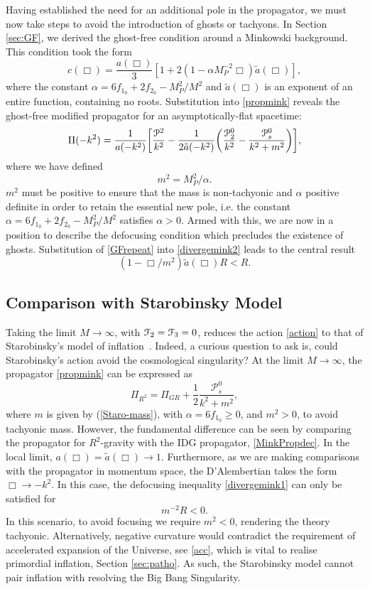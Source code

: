 Having established the need for an additional pole in the propagator, we must now take steps to avoid the introduction of ghosts or tachyons. In  Section \ref{sec:GF}, we derived the ghost-free condition around a Minkowski background. This condition took the form
\[
\label{GFrepeat}
c(\Box)=\frac{a(\Box)}{3}\left[1+2(1-\alpha M_P^{-2}\Box){\tilde a}(\Box)\right]
, \]
where the constant $\alpha=6f_{1_{0}}+2f_{2_{0}}-M_{P}^{2}/M^{2}$ and ${\tilde a}(\Box)$ is an exponent of an entire function, containing no roots. Substitution into \eqref{propmink} reveals the ghost-free modified propagator for an asymptotically-flat spacetime:
\[
\label{MinkPropdec}
\Pi(-k^{2})=\frac{1}{a(-k^{2})}\biggl[\frac{{\cal P}^{2}}{k^{2}}-\frac{1}{2\tilde{a}(-k^{2})}\biggl(\frac{{\cal P}_{2}^{0}}{k^{2}}-\frac{{\cal P}_{s}^{0}}{k^{2}+m^{2}}\biggr)\biggr]
, \]
where we have defined
\[
\label{Staro-mass}
m^2=M_P^2/\alpha
.\]
$m^2$ must be positive to ensure that the mass is non-tachyonic and $\alpha$ positive definite in order to retain the essential new pole, i.e. the constant $\alpha=6f_{1_{0}}+2f_{2_{0}}-M_{P}^{2}/M^{2}$ satisfies $\alpha>0$. Armed with this, we are now in a position to describe the defocusing condition which precludes the existence of ghosts. Substitution of \eqref{GFrepeat} into \eqref{divergemink2} leads to the central result
\[
\label{defocusmink}
(1-\Box/m^2){\tilde a}(\Box)R<R
.\]
\subsection{Comparison with Starobinsky Model}
Taking the limit $M \rightarrow \infty$, with  ${\cal F}_2={\cal F}_3=0$, reduces the action \eqref{action} to that of Starobinsky's model of 
inflation~\cite{Starobinsky:1979ty}. Indeed, a curious question to ask is, could Starobinsky's action avoid the cosmological singularity? At the limit $M\rightarrow \infty$,  the propagator \eqref{propmink} can be expressed as
\[
\label{propR2}
\Pi_{R^{2}}=\Pi_{GR}+\frac{1}{2}\frac{\mathcal{P}_{s}^{0}}{k^{2}+m^{2}} ,
\]
where $m$ is given by (\ref{Staro-mass}), with $\alpha=6f_{1_0}\geq 0$, and $m^2>0$, to avoid tachyonic mass.
 However, the fundamental difference can be seen by comparing the propagator for $R^2$-gravity with the IDG propagator, \eqref{MinkPropdec}.  In the local limit, $a(\Box)={\widetilde a}(\Box)\rightarrow 1$. Furthermore, as we are making comparisons with the propagator in momentum space, the D'Alembertian takes the form $\Box\rightarrow -k^2$. In this case, the defocusing inequality \eqref{divergemink1} can only be satisfied for 
\[
m^{-2} R<0
.\]
In this scenario, to avoid focusing we require $m^2< 0$, rendering the theory tachyonic. Alternatively, negative curvature would contradict the requirement of accelerated expansion of the Universe, see \eqref{acc}, which is vital to realise primordial inflation, Section \ref{sec:patho}. As such, the Starobinsky model cannot pair inflation with resolving the Big Bang Singularity.
